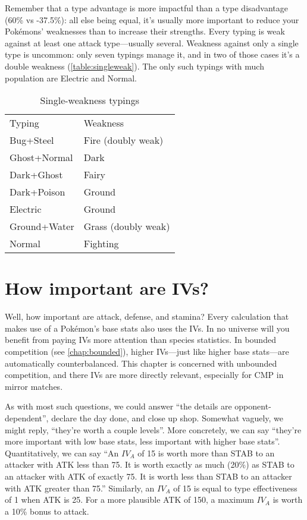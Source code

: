 Remember that a type advantage is more impactful than a type
  disadvantage (60\% vs -37.5\%):
  all else being equal, it's usually more important to reduce your Pokémons'
  weaknesses than to increase their strengths.
Every typing is weak against at least one attack type---usually several.
Weakness against only a single type is uncommon: only seven typings manage it, and in two
 of those cases it's a double weakness (\autoref{table:singleweak}).
The only such typings with much population are Electric and Normal. 
\begin{table}[ht]
\centering
\begin{tabular}{ll}
Typing & Weakness\\
\Midrule
Bug+Steel & Fire (doubly weak) \\
Ghost+Normal & Dark \\
Dark+Ghost & Fairy \\
Dark+Poison & Ground \\
Electric & Ground \\
Ground+Water & Grass (doubly weak) \\
Normal & Fighting \\
\end{tabular}
  \caption{Single-weakness typings\label{table:singleweak}}
\end{table}

\section{How important are IVs?}
Well, how important are attack, defense, and stamina?
Every calculation that makes use of a Pokémon's base stats also uses the IVs.
In no universe will you benefit from paying IVs more attention than species statistics.
In bounded competition (see \autoref{chap:bounded}), higher IVs---just like higher
  base stats---are automatically counterbalanced.
This chapter is concerned with unbounded competition, and there IVs are more directly
  relevant, especially for CMP in mirror matches.

As with most such questions, we could answer ``the details are opponent-dependent'',
  declare the day done, and close up shop.
Somewhat vaguely, we might reply, ``they're worth a couple levels''.
More concretely, we can say ``they're more important with low base stats, less important
  with higher base stats''.
Quantitatively, we can say ``An $IV_A$ of 15 is worth more than STAB to an
  attacker with ATK less than 75. It is worth exactly as much (20\%) as STAB
  to an attacker with ATK of exactly 75. It is worth less than STAB
  to an attacker with ATK greater than 75.''
Similarly, an $IV_A$ of 15 is equal to type effectiveness of 1 when ATK is 25.
For a more plausible ATK of 150, a maximum $IV_A$ is worth a 10\% bonus to attack.

